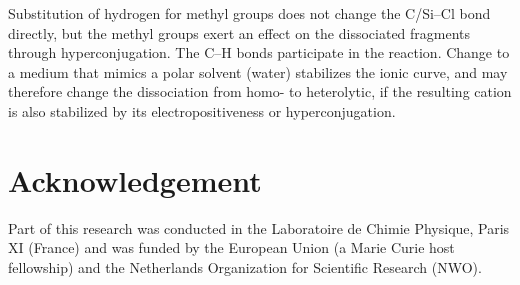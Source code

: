Substitution of hydrogen for methyl groups does not change the C/Si--Cl bond directly, but the methyl groups exert an effect on the dissociated fragments through hyperconjugation.  The C--H bonds participate in the reaction.  Change to a medium that mimics a polar solvent (water) stabilizes the ionic curve, and may therefore change the dissociation from homo- to heterolytic, if the resulting cation is also stabilized by its electropositiveness or hyperconjugation.
 
\section*{Acknowledgement}

Part of this research was conducted in the Laboratoire de Chimie Physique, Paris XI (France) and was funded by the European Union (a Marie Curie host fellowship) and the Netherlands Organization for Scientific Research (NWO).



